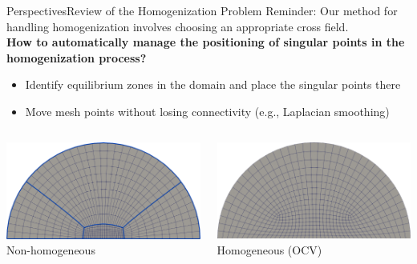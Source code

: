 \documentclass[compress,10pt,aspectratio=169]{beamer}
\begin{document}
\begin{frame}{Perspectives}{Review of the Homogenization Problem}
\small
Reminder: Our method for handling homogenization involves choosing an appropriate cross field.\\\vspace{0.2cm}
{\bf How to automatically manage the positioning of singular points in the homogenization process?}\\\vspace{0.2cm}
\begin{itemize}
    \item Identify equilibrium zones in the domain and place the singular points there
    \item Move mesh points without losing connectivity (e.g., Laplacian smoothing)\\\vspace{0.2cm}
\end{itemize}
\begin{columns}
    \begin{column}{0.55\textwidth}
\centering
\includegraphics[scale=0.09]{images/non_homo_demiDisc.pdf}\\
\footnotesize Non-homogeneous
    \end{column}
    \begin{column}{0.55\textwidth}
        \centering
\includegraphics[scale=0.09]{images/homo_avec_bord_demiDisc.pdf}\\
\footnotesize Homogeneous (OCV)
    \end{column}
\end{columns}
\end{frame}
\end{document}
